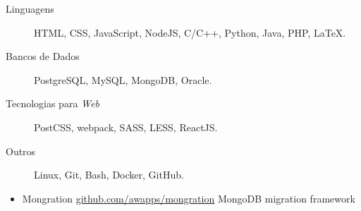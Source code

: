 \documentclass[letterpaper,11pt]{article}
\begin{document}
    \begin{description}
        \item[Linguagens]
            HTML, CSS, JavaScript, NodeJS, C/C++, Python, Java, PHP, \LaTeX.
        \item[Bancos de Dados]
            PostgreSQL, MySQL, MongoDB, Oracle.
        \item[Tecnologias para \textit{Web}]
            PostCSS, webpack, SASS, LESS, ReactJS.
        \item[Outros]
            Linux, Git, Bash, Docker, GitHub.
    \end{description}

    \begin{itemize}
        \item
            \ressubheading
                {Mongration}
                {\href{https://github.com/awapps/mongration}{github.com/awapps/mongration}}
                {MongoDB migration framework}
                {}
    \end{itemize}
\end{document}
